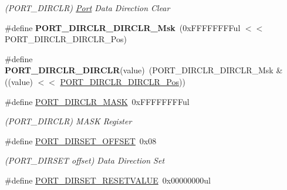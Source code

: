 \begin{DoxyCompactItemize}
\begin{DoxyCompactList}\small\item\em (P\+O\+R\+T\+\_\+\+D\+I\+R\+C\+L\+R) \hyperlink{struct_port}{Port} Data Direction Clear \end{DoxyCompactList}\item 
\hypertarget{group___s_a_m_l21___p_o_r_t_ga5c1e3f46819a99640cb16a7e16298c97}{}\#define {\bfseries P\+O\+R\+T\+\_\+\+D\+I\+R\+C\+L\+R\+\_\+\+D\+I\+R\+C\+L\+R\+\_\+\+Msk}~(0x\+F\+F\+F\+F\+F\+F\+F\+Ful $<$$<$ P\+O\+R\+T\+\_\+\+D\+I\+R\+C\+L\+R\+\_\+\+D\+I\+R\+C\+L\+R\+\_\+\+Pos)\label{group___s_a_m_l21___p_o_r_t_ga5c1e3f46819a99640cb16a7e16298c97}

\item 
\hypertarget{group___s_a_m_l21___p_o_r_t_ga0d5423999a4724201584a4388c8d23c1}{}\#define {\bfseries P\+O\+R\+T\+\_\+\+D\+I\+R\+C\+L\+R\+\_\+\+D\+I\+R\+C\+L\+R}(value)~(P\+O\+R\+T\+\_\+\+D\+I\+R\+C\+L\+R\+\_\+\+D\+I\+R\+C\+L\+R\+\_\+\+Msk \& ((value) $<$$<$ \hyperlink{group___s_a_m_l21___p_o_r_t_gaab58ac44a417949e78c7e743c2b6cb8e}{P\+O\+R\+T\+\_\+\+D\+I\+R\+C\+L\+R\+\_\+\+D\+I\+R\+C\+L\+R\+\_\+\+Pos}))\label{group___s_a_m_l21___p_o_r_t_ga0d5423999a4724201584a4388c8d23c1}

\item 
\hypertarget{group___s_a_m_l21___p_o_r_t_gaf03d21b4e469df93029d2e6a017c7e9e}{}\#define \hyperlink{group___s_a_m_l21___p_o_r_t_gaf03d21b4e469df93029d2e6a017c7e9e}{P\+O\+R\+T\+\_\+\+D\+I\+R\+C\+L\+R\+\_\+\+M\+A\+S\+K}~0x\+F\+F\+F\+F\+F\+F\+F\+Ful\label{group___s_a_m_l21___p_o_r_t_gaf03d21b4e469df93029d2e6a017c7e9e}

\begin{DoxyCompactList}\small\item\em (P\+O\+R\+T\+\_\+\+D\+I\+R\+C\+L\+R) M\+A\+S\+K Register \end{DoxyCompactList}\item 
\hypertarget{group___s_a_m_l21___p_o_r_t_gacbe953a0e93e6e780964524f176fc408}{}\#define \hyperlink{group___s_a_m_l21___p_o_r_t_gacbe953a0e93e6e780964524f176fc408}{P\+O\+R\+T\+\_\+\+D\+I\+R\+S\+E\+T\+\_\+\+O\+F\+F\+S\+E\+T}~0x08\label{group___s_a_m_l21___p_o_r_t_gacbe953a0e93e6e780964524f176fc408}

\begin{DoxyCompactList}\small\item\em (P\+O\+R\+T\+\_\+\+D\+I\+R\+S\+E\+T offset) Data Direction Set \end{DoxyCompactList}\item 
\hypertarget{group___s_a_m_l21___p_o_r_t_gacff4d1ab9a1fe8e242ebd247d5de9c7d}{}\#define \hyperlink{group___s_a_m_l21___p_o_r_t_gacff4d1ab9a1fe8e242ebd247d5de9c7d}{P\+O\+R\+T\+\_\+\+D\+I\+R\+S\+E\+T\+\_\+\+R\+E\+S\+E\+T\+V\+A\+L\+U\+E}~0x00000000ul\label{group___s_a_m_l21___p_o_r_t_gacff4d1ab9a1fe8e242ebd247d5de9c7d}


\end{DoxyCompactItemize}
